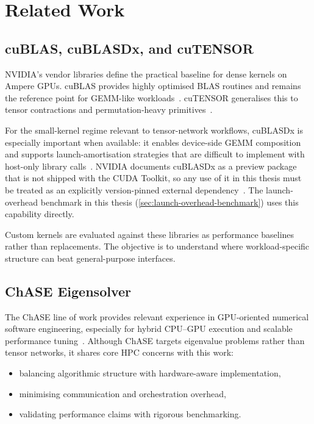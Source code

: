 \section{Related Work}\label{sec:related-work}

\subsection{cuBLAS, cuBLASDx, and cuTENSOR}\label{sec:cublas-cublasdx-cutensor}

NVIDIA's vendor libraries define the practical baseline for dense kernels on
Ampere GPUs. cuBLAS provides highly optimised BLAS routines and remains the
reference point for GEMM-like workloads~\cite{cublas}. cuTENSOR generalises
this to tensor contractions and permutation-heavy primitives~\cite{cutensor}.

For the small-kernel regime relevant to tensor-network workflows, cuBLASDx is
especially important when available: it enables device-side GEMM composition
and supports launch-amortisation strategies that are difficult to implement
with host-only library calls~\cite{cublasdx}. NVIDIA documents cuBLASDx as a
preview package that is not shipped with the CUDA Toolkit, so any use of it in
this thesis must be treated as an explicitly version-pinned external
dependency~\cite{cublas,nvidia-cublasdx-downloads}. The launch-overhead benchmark in this thesis (\cref{sec:launch-overhead-benchmark}) uses this capability directly.

Custom kernels are evaluated against these libraries as
performance baselines rather than replacements. The objective is to understand
where workload-specific structure can beat general-purpose interfaces.

\subsection{ChASE Eigensolver}\label{sec:chase}

The ChASE line of work provides relevant experience in GPU-oriented numerical
software engineering, especially for hybrid CPU--GPU execution and scalable
performance tuning~\cite{winkelmann2019chase,wu2022chase-gpu,wu2023chase-nccl}.
Although ChASE targets eigenvalue problems rather than tensor networks, it
shares core HPC concerns with this work:

\begin{itemize}
  \item balancing algorithmic structure with hardware-aware implementation,
  \item minimising communication and orchestration overhead,
  \item validating performance claims with rigorous benchmarking.
\end{itemize}

